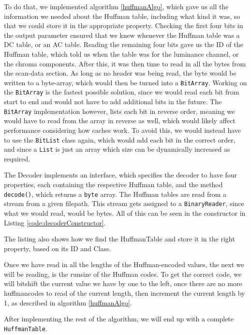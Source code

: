 To do that, we implemented algorithm \ref{huffmanAlgo}, which gave us all the information we needed about the Huffman table, including what kind it was, so that we could store it in the appropriate property. 
Checking the first four bits in the output parameter ensured that we knew whenever the Huffman table was a DC table, or an AC table. 
Reading the remaining four bits gave us the ID of the Huffman table, which told us when the table was for the luminance channel, or the chroma components.
After this, it was then time to read in all the bytes from the scan-data section. As long as no header was being read, the byte would be written to a byte-array, which would then be turned into a \lstinline|BitArray|.
Working on the \lstinline|BitArray| is the fastest possible solution, since we would read each bit from start to end and would not have to add additional bits in the future. The \lstinline|BitArray| implementation however, lists each bit in reverse order, meaning we would have to read from the array in reverse as well, which would likely affect performance considering how caches work.
To avoid this, we would instead have to use the \lstinline|BitList| class again, which would add each bit in the correct order, and since a \lstinline|List| is just an array which size can be dynamically increased as required. 

The Decoder implements an interface, which specifies the decoder to have four properties, each containing the respective Huffman table, and the method \lstinline|decode()|, which returns a \lstinline|byte| array. 
The Huffman tables are read from a stream from a given filepath. This stream gets assigned to a \lstinline|BinaryReader|, since what we would read, would be bytes. All of this can be seen in the constructor in Listing \ref{code:decoderConstructor}.
 

The listing also shows how we find the HuffmanTable and store it in the right property, based on its ID and Class.

Once we have read in all the lengths of the Huffman-encoded values, the next we will be reading, is the runsize of the Huffman codes. To get the correct code, we will bitshift the current value we have by one to the left, once there are no more huffmancodes to read of the current length, then increment the current length by 1, as described in algorithm \ref{huffmanAlgo}.

After implementing the rest of the algorithm, we will end up with a complete \lstinline|HuffmanTable|.
